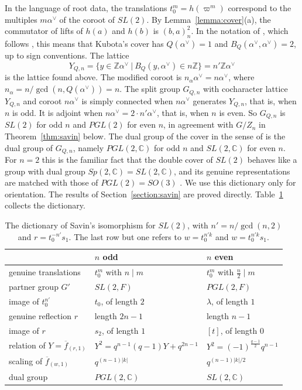 \documentclass[12pt,letterpaper]{amsart}
\numberwithin{equation}{section}
\theoremstyle{definition}
\theoremstyle{remark}
\newcommand{\C}{\mathbb{C}}
\newcommand{\Z}{\mathbb{Z}}
\newcommand{\fbar}{\overline{f}}
\begin{document}
In the language of root data, the translations $t_0^m=h(\varpi^m)$
correspond to the multiples $m\alpha^\vee$ of the coroot of $SL(2)$. By
Lemma~\ref{lemma:cover}(a), the commutator of lifts of $h(a)$ and
$h(b)$ is $(b,a)_n^2$. In the notation of \cite[\S2.1]{Wa24}, which
follows \cite{We18}, this means that Kubota's cover has
$Q(\alpha^\vee)=1$ and $B_Q(\alpha^\vee,\alpha^\vee)=2$, up to sign
conventions. The lattice
\[
Y_{Q,n}=\{y\in\Z\alpha^\vee\ |\ B_Q(y,\alpha^\vee)\in n\Z\}
=n'\Z\alpha^\vee
\]
is the lattice found above. The modified coroot is
$n_\alpha\alpha^\vee=n\alpha^\vee$, where
$n_\alpha=n/\gcd(n,Q(\alpha^\vee))=n$. The split group $G_{Q,n}$ with
cocharacter lattice $Y_{Q,n}$ and coroot $n\alpha^\vee$ is simply
connected when $n\alpha^\vee$ generates $Y_{Q,n}$, that is, when $n$ is
odd. It is adjoint when $n\alpha^\vee=2\cdot n'\alpha^\vee$, that is,
when $n$ is even. So $G_{Q,n}$ is $SL(2)$ for odd $n$ and $PGL(2)$ for
even $n$, in agreement with $G/Z_n$ in Theorem~\ref{thm:savin} below.
The dual group of the cover in the sense of \cite{We18} is the dual
group of $G_{Q,n}$, namely $PGL(2,\C)$ for odd $n$ and $SL(2,\C)$ for
even $n$. For $n=2$ this is the familiar fact that the double cover of
$SL(2)$ behaves like a group with dual group $Sp(2,\C)=SL(2,\C)$, and
its genuine representations are matched with those of $PGL(2)=SO(3)$
\cite{Wa80}. We use this dictionary only for orientation. The results
of Section~\ref{section:savin} are proved directly.
Table~\ref{tab:lattice} collects the dictionary.

\begin{table}[ht]
\caption{The dictionary of Savin's isomorphism for $SL(2)$, with
$n'=n/\gcd(n,2)$ and $r=t_0^{-n'}s_1$. The last row but one refers to
$w=t_0^{n'k}$ and $w=t_0^{n'k}s_1$.}
\label{tab:lattice}
\begin{tabular}{@{}lll@{}}
\toprule
 & $n$ odd & $n$ even \\
\midrule
genuine translations & $t_0^m$ with $n\mid m$ & $t_0^m$ with $\frac
n2\mid m$ \\
partner group $G'$ & $SL(2,F)$ & $PGL(2,F)$ \\
image of $t_0^{n'}$ & $t_0$, of length $2$ & $\lambda$, of length $1$ \\
genuine reflection $r$ & length $2n-1$ & length $n-1$ \\
image of $r$ & $s_2$, of length $1$ & $[t]$, of length $0$ \\
relation of $Y=\fbar_{(r,1)}$ & $Y^2=q^{n-1}(q-1)Y+q^{2n-1}$ &
$Y^2=(-1)^{\frac{q-1}{2}}q^{n-1}$ \\
scaling of $\fbar_{(w,1)}$ & $q^{(n-1)|k|}$ & $q^{(n-1)|k|/2}$ \\
dual group & $PGL(2,\C)$ & $SL(2,\C)$ \\
\bottomrule
\end{tabular}
\end{table}
\end{document}
